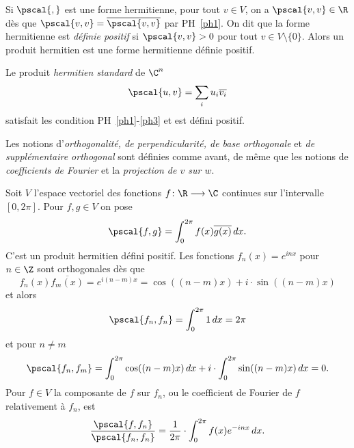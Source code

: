 \begin{remark}
Si $\pscal{,} $  est une forme hermitienne, 
pour tout $v \in V$, on a $\pscal{v,v} \in \R$ dès que $\pscal{v,v} = \overline{\pscal{v,v}}$ par PH~\ref{ph1}.  On dit que la forme hermitienne   est \emph{définie positif} si $\pscal{v,v} >0$ pour tout $v \in V \setminus\{0\}$. Alors un produit hermitien est une forme hermitienne définie positif. 
\end{remark}

\begin{example}
  \label{exe:12}
  Le produit \emph{hermitien standard} de $\C^n$ 
  \begin{displaymath}
    \pscal{u,v} = \sum_i u_i \overline{v_i}
  \end{displaymath}
  satisfait les condition PH~\ref{ph1}-\ref{ph3} et est défini positif.  
\end{example}


Les notions d'\emph{orthogonalité, de perpendicularité, de base orthogonale} et \emph{de supplémentaire orthogonal}  sont définies comme avant, de même que les notions de \emph{coefficients de Fourier} et la \emph{projection de $v$ sur $w$}. 

\begin{example}
  \label{exe:13}
  Soit $V$ l'espace vectoriel des fonctions $f\colon \R \longrightarrow \C$   continues sur l'intervalle $[0, 2\pi]$. Pour $f,g \in V$ on pose
  \begin{displaymath}
    \pscal{f,g} = \int_0^{2\pi} f(x) \overline{g(x)} \, dx.
  \end{displaymath}
C'est un produit hermitien défini positif. Les fonctions $f_n (x)=  e^{inx}$ pour $n \in \Z$ sont orthogonales dès que 
\begin{displaymath}
  f_n(x) \overline{f_m(x)} = e^{i(n-m)x} = \cos((n-m) x) + i \cdot \sin((n-m) x)
\end{displaymath}
et alors 
\begin{displaymath}
  \pscal{f_n,f_n} = \int_0^{2 \pi} 1 \, dx = 2 \pi 
\end{displaymath}
et pour $n \neq m$ 
\begin{displaymath}
  \pscal{f_n,f_m} = \int_0^{2 \pi} \cos( (n-m) x) \, dx  + i \cdot \int_0^{2 \pi} \sin( (n-m) x) \, dx = 0.
\end{displaymath}
Pour $f \in V$ la composante de $f$ sur $f_n$, ou le coefficient de Fourier de $f$ relativement à $f_n$, est 
\begin{displaymath}
  \frac{\pscal{f,f_n}}{\pscal{f_n,f_n}} = \frac{1}{2\pi} \cdot \int_0^{2\pi} f(x) e^{-inx} \, dx. 
\end{displaymath}
\end{example}





